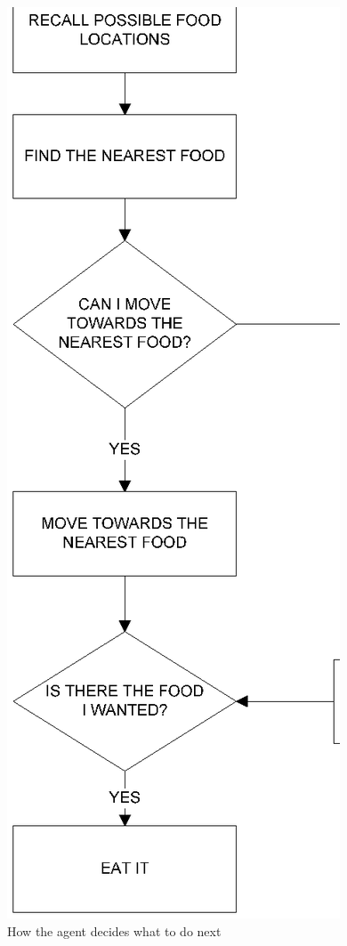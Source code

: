 \begin{figure}
  \centering                                
  \includegraphics[scale=0.7]{diagrams/solution/decision-flowchart.eps}    
  \caption{How the agent decides what to do next}
  \label{solution:decision}
\end{figure}

